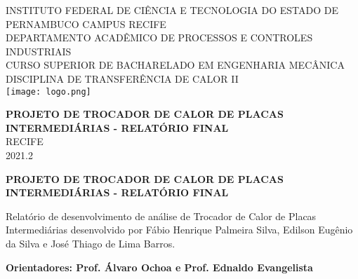 \documentclass[a4paper,12pt,oneside]{article}
\begin{document}
	
\begin{center}

	\large{
		INSTITUTO FEDERAL DE CIÊNCIA E TECNOLOGIA DO ESTADO DE PERNAMBUCO CAMPUS RECIFE\\ 
		\vspace{0.2cm}
		DEPARTAMENTO ACADÊMICO DE PROCESSOS E CONTROLES INDUSTRIAIS\\
		\vspace{0.2cm} 
		CURSO SUPERIOR DE BACHARELADO EM ENGENHARIA MECÂNICA\\
		\vspace{0.2cm} 
		DISCIPLINA DE TRANSFERÊNCIA DE CALOR II\\ 
		\vspace{1.3cm}
		\texttt{[image: logo.png]}\\
		\vspace{1cm}

		
		\vspace{1.7cm}
		\textbf{PROJETO DE TROCADOR DE CALOR DE PLACAS INTERMEDIÁRIAS - RELATÓRIO FINAL
		}\\
		\vspace{3.5cm}
		RECIFE\\
		\vspace{0.2cm}
		2021.2	
	}

\end{center}
\thispagestyle{empty}

\pagebreak
\clearpage
\newpage

\begin{center}

\large{


\vspace{5.6cm}	
\textbf{PROJETO DE TROCADOR DE CALOR DE PLACAS INTERMEDIÁRIAS - RELATÓRIO FINAL}}

\end{center}

\vspace{2.5cm}

\hfill\begin{minipage}{0.5\linewidth}\large
{Relatório de desenvolvimento de análise de Trocador de Calor de Placas Intermediárias desenvolvido por Fábio Henrique Palmeira Silva, Edilson Eugênio da Silva e José Thiago de Lima Barros.} 
\end{minipage}
\vspace{0.9cm}
\begin{flushright}
\large \textbf{	Orientadores: Prof. Álvaro Ochoa e Prof. Ednaldo Evangelista}
\end{flushright}
\end{document}

